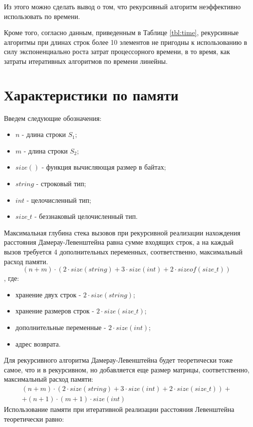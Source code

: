 Из этого можно сделать вывод о том, что рекурсивный алгоритм неэффективно использовать по времени.

Кроме того, согласно данным, приведенным в Таблице \ref{tbl:time}, рекурсивные алгоритмы при длинах строк более 10 элементов не пригодны к использованию в силу экспоненциально роста затрат процессорного времени, в то время, как затраты итеративных алгоритмов по времени линейны.

\section{Характеристики по памяти}

Введем следующие обозначения:
\begin{itemize}
	\item$n$ - длина строки $S_{1}$;
	\item$m$ - длина строки $S_{2}$;
	\item$size()$ - функция вычисляющая размер в байтах;
	\item $string$ - строковый тип;
	\item $int$ - целочисленный тип;
	\item $size\_t$ - беззнаковый целочисленный тип.
\end{itemize}

Максимальная глубина стека вызовов при рекурсивной реализации нахождения расстояния Дамерау-Левенштейна равна сумме входящих строк, а на каждый вызов требуется 4 дополнительных переменных, соответственно, максимальный расход памяти.
\begin{equation}
	(n + m) \cdot (2 \cdot size(string) + 3 \cdot size(int) + 2 \cdot sizeof(size\_t))
\end{equation}
, где:
\begin{itemize}
	\item хранение двух строк - $2 \cdot size(string)$;
	\item хранение размеров строк - $2 \cdot size(size\_t)$;
	\item дополнительные переменные - $2 \cdot size(int)$;
	\item адрес возврата.
\end{itemize}

Для рекурсивного алгоритма Дамерау-Левенштейна будет теоретически тоже самое, что и в рекурсивном, но добавляется еще размер матрицы, соответственно, максимальный расход памяти:
\begin{equation}
	\begin{aligned}
		(n + m) \cdot (2 \cdot size(string) + 3 \cdot size(int) + 2 \cdot size(size\_t)) + \\
		+ (n + 1) \cdot (m + 1) \cdot size(int)
	\end{aligned}
\end{equation}
Использование памяти при итеративной реализации расстояния Левенштейна теоретически равно:

